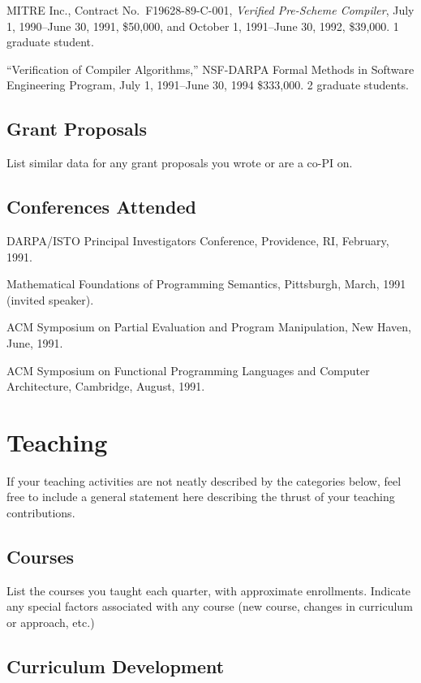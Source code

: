 MITRE Inc., Contract No.~F19628-89-C-001, {\it {Verified Pre-Scheme
Compiler}\/}, July 1, 1990--June 30, 1991, \$50,000, and October 1, 1991--June
30, 1992, \$39,000. 1 graduate student.

``Verification of Compiler Algorithms,'' NSF-DARPA Formal Methods in Software
Engineering Program, July 1, 1991--June 30, 1994 \$333,000. 2 graduate
students. 

\subsection{Grant Proposals}

List similar data for any grant proposals you wrote or are a co-PI on.

\subsection{Conferences Attended}

DARPA/ISTO Principal Investigators Conference, Providence, RI, February, 1991.

Mathematical Foundations of Programming Semantics, Pittsburgh, March, 1991
(invited speaker).

ACM Symposium on Partial Evaluation and Program Manipulation, New Haven, June,
1991.

ACM Symposium on Functional Programming Languages and Computer Architecture,
Cambridge, August, 1991.

\section{Teaching}

If your teaching activities are not neatly described by the categories
below, feel free to include a general statement here describing the thrust
of your teaching contributions.

\subsection{Courses}

List the courses you taught each quarter, with approximate enrollments.
Indicate any special factors associated with any course (new course,
changes in curriculum or approach, etc.)

\subsection{Curriculum Development}

